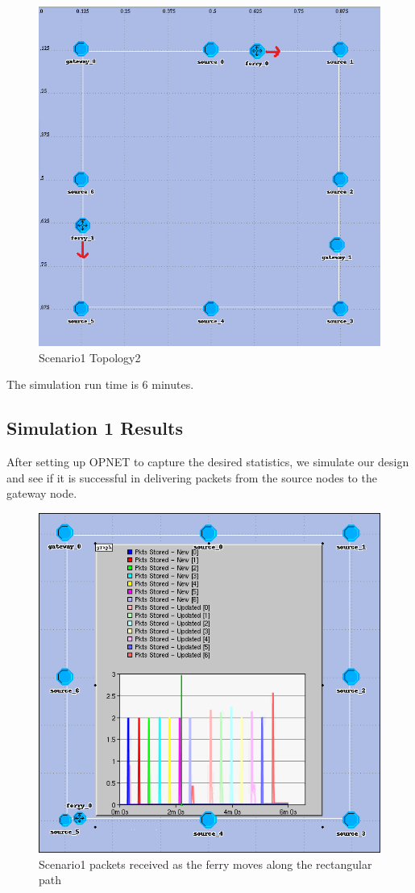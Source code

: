 \begin{figure}[h]
    \centering
    \includegraphics[width=.7\textwidth]{images/scenario1-top2}
    \caption{Scenario1 Topology2}
    \label{fig:scenario1}
\end{figure}

The simulation run time is 6 minutes.  

\subsection{Simulation 1 Results}

After setting up OPNET to capture the desired statistics, we simulate our design and see if it is successful in delivering packets from the source nodes to the gateway node.


\begin{figure}[h]
    \centering
    \includegraphics[width=.5\textwidth]{images/scenario1-result-received}
    \caption{Scenario1 packets received as the ferry moves along the rectangular path}
    \label{fig:result1-a}
\end{figure}

